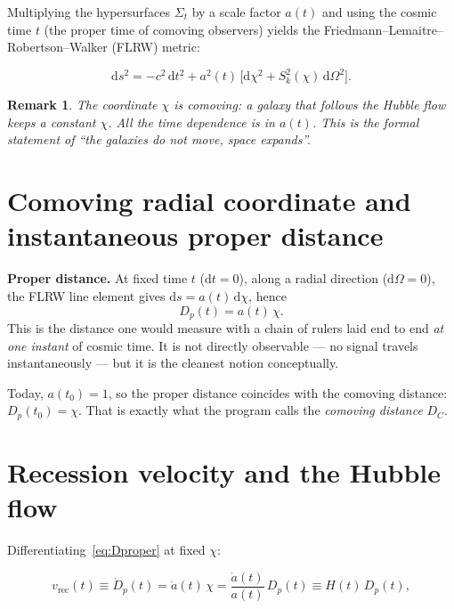 \documentclass[11pt,a4paper,openany]{report}
\newcommand{\dif}{\mathrm{d}}
\newcommand{\eqdef}{\equiv}
\newtheorem{remark}[theorem]{Remark}
\begin{document}
\noindent Multiplying the hypersurfaces $\Sigma_t$ by a scale factor $a(t)$ and
using the cosmic time $t$ (the proper time of comoving observers) yields the
Friedmann--Lemaitre--Robertson--Walker (FLRW) metric:

\begin{equation}
\boxed{\;\dif s^{2} = -c^{2}\,\dif t^{2} + a^{2}(t)\,\bigl[\dif\chi^{2}
+ S_{k}^{2}(\chi)\,\dif\Omega^{2}\bigr].\;}
\label{eq:FLRW}
\end{equation}

\begin{remark}
The coordinate $\chi$ is \emph{comoving}: a galaxy that follows the Hubble flow
keeps a constant $\chi$. All the time dependence is in $a(t)$. This is the
formal statement of “the galaxies do not move, space expands”.
\end{remark}

\section{Comoving radial coordinate and instantaneous proper distance}

\begin{tcolorbox}[undergrad]
\textbf{Proper distance.} At fixed time $t$ ($\dif t = 0$), along a radial
direction ($\dif\Omega = 0$), the FLRW line element gives
$\dif s = a(t)\,\dif\chi$, hence
\begin{equation}
D_{p}(t) = a(t)\,\chi .
\label{eq:Dproper}
\end{equation}
This is the distance one would measure with a chain of rulers laid end to end
\emph{at one instant} of cosmic time. It is not directly observable --- no
signal travels instantaneously --- but it is the cleanest notion conceptually.
\end{tcolorbox}

Today, $a(t_0) = 1$, so the proper distance coincides with the comoving
distance: $D_{p}(t_0) = \chi$. That is exactly what the program calls the
\emph{comoving distance} $D_{C}$.

\section{Recession velocity and the Hubble flow}

Differentiating~\eqref{eq:Dproper} at fixed $\chi$:

\begin{equation}
v_{\text{rec}}(t) \eqdef \dot{D}_{p}(t) = \dot{a}(t)\,\chi
 = \frac{\dot{a}(t)}{a(t)}\,D_{p}(t) \eqdef H(t)\,D_{p}(t),
\label{eq:Hubble_law}
\end{equation}
\end{document}
